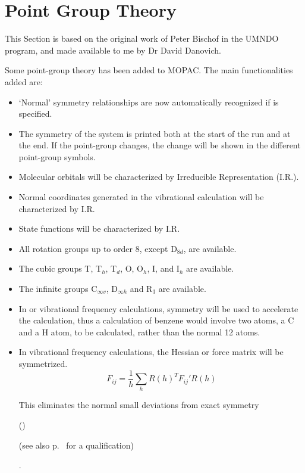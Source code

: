 \section{Point Group Theory}
  
This Section is based on the original work of Peter Bischof in the UMNDO
program, and made available to me by Dr David Danovich.

Some point-group theory has been added to MOPAC.  The main functionalities
added are: 

\begin{itemize}
\item `Normal' symmetry relationships are now automatically recognized if
 is specified.

\item The symmetry of the system is printed both at the start of the run and at
the end.  If the point-group changes, the change will be shown in the different
point-group symbols.

\item Molecular orbitals will be characterized by Irreducible Representation 
(I.R.). 

\item Normal coordinates generated in the vibrational calculation will be
characterized by I.R.

\item State functions will be characterized by I.R.

\item All rotation groups up to order 8, except D$_{8d}$, are available.

\item The cubic groups T, T$_h$, T$_d$, O, O$_h$, I, and I$_h$ are available.

\item The infinite groups C$_{\infty v}$, D$_{\infty h}$ and R$_3$ are
available.

\item In  or vibrational frequency calculations, symmetry will be
used to accelerate the calculation, thus a calculation of benzene would involve
two atoms, a C and a H atom, to be calculated, rather than the normal 12 atoms.

\item In vibrational frequency calculations, the Hessian or force matrix
will be symmetrized.   \label{sym_force}
$$
F_{ij}=\frac{1}{h}\sum_hR(h)^TF_{ij}'R(h)
$$

This eliminates the normal small deviations from exact symmetry
\begin{htmlonly}
()
\end{htmlonly}
\begin{latexonly}
(see also p.~\pageref{fc}
for a qualification)
\end{latexonly}.

\end{itemize}



